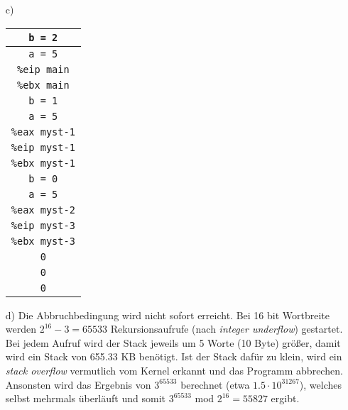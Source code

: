 \documentclass[a4paper,10pt]{scrartcl}
\begin{document}
\begin{enumerate}
\begin{enumerate}
            \item[c)]
                \begin{tabular}[t]{|c|}
                \hline
                \texttt{b = 2} \\ \hline
                \texttt{a = 5} \\ \hline
                \texttt{\%eip main} \\ \hline
                \texttt{\%ebx main} \\ \hline
                \texttt{b = 1} \\ \hline
                \texttt{a = 5} \\ \hline
                \texttt{\%eax myst-1} \\ \hline
                \texttt{\%eip myst-1} \\ \hline
                \texttt{\%ebx myst-1} \\ \hline
                \texttt{b = 0} \\ \hline
                \texttt{a = 5} \\ \hline
                \texttt{\%eax myst-2} \\ \hline
                \texttt{\%eip myst-3} \\ \hline
                \texttt{\%ebx myst-3} \\ \hline
                \texttt{0} \\ \hline
                \texttt{0} \\ \hline
                \texttt{0} \\ \hline
                \end{tabular}


            \item[d)]
                Die Abbruchbedingung wird nicht sofort erreicht. Bei 16 bit Wortbreite werden
                $2^{16} - 3 = 65533$ Rekursionsaufrufe (nach \emph{integer underflow}) gestartet.
                Bei jedem Aufruf wird der Stack jeweils um 5 Worte (10 Byte) größer, damit
                wird ein Stack von 655.33 KB benötigt. Ist der Stack dafür zu klein, wird ein
                \emph{stack overflow} vermutlich vom Kernel erkannt und das Programm
                abbrechen. Ansonsten wird das Ergebnis von $3^{65533}$ berechnet (etwa $1.5 \cdot 10^{31267}$),
                welches selbst mehrmals überläuft und somit $3^{65533} \text{ mod } 2^{16} = 55827$
                ergibt.

        \end{enumerate}
\end{enumerate}
\end{document}
